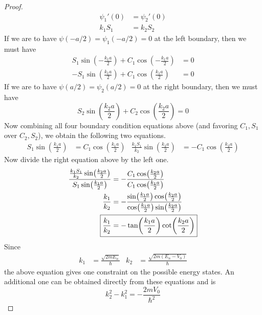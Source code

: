 \documentclass[../psets.tex]{subfiles}
\begin{document}
\begin{enumerate}
\begin{enumerate}
\begin{proof}
            \begin{align*}
                \psi_1'(0) &= \psi_2'(0)\\
                k_1S_1 &= k_2S_2
            \end{align*}
            If we are to have $\psi(-a/2)=\psi_1(-a/2)=0$ at the left boundary, then we must have
            \begin{align*}
                S_1\sin(-\frac{k_1a}{2})+C_1\cos(-\frac{k_1a}{2}) &= 0\\
                -S_1\sin(\frac{k_1a}{2})+C_1\cos(\frac{k_1a}{2}) &= 0
            \end{align*}
            If we are to have $\psi(a/2)=\psi_2(a/2)=0$ at the right boundary, then we must have
            \begin{equation*}
                S_2\sin(\frac{k_2a}{2})+C_2\cos(\frac{k_2a}{2}) = 0
            \end{equation*}
            Now combining all four boundary condition equations above (and favoring $C_1,S_1$ over $C_2,S_2$), we obtain the following two equations.
            \begin{align*}
                S_1\sin(\frac{k_1a}{2}) &= C_1\cos(\frac{k_1a}{2})&
                \frac{k_1S_1}{k_2}\sin(\frac{k_2a}{2}) &= -C_1\cos(\frac{k_2a}{2})
            \end{align*}
            Now divide the right equation above by the left one.
            \begin{align*}
                \frac{\frac{k_1S_1}{k_2}\sin(\frac{k_2a}{2})}{S_1\sin(\frac{k_1a}{2})} &= -\frac{C_1\cos(\frac{k_2a}{2})}{C_1\cos(\frac{k_1a}{2})}\\
                \frac{k_1}{k_2} &= -\frac{\sin(\frac{k_1a}{2})\cos(\frac{k_2a}{2})}{\cos(\frac{k_1a}{2})\sin(\frac{k_2a}{2})}\\
                \Aboxed{\frac{k_1}{k_2} &= -\tan(\frac{k_1a}{2})\cot(\frac{k_2a}{2})}
            \end{align*}
            Since
            \begin{align*}
                k_1 &= \frac{\sqrt{2mE_n}}{\hbar}&
                k_2 &= \frac{\sqrt{2m(E_n-V_0)}}{\hbar}
            \end{align*}
            the above equation gives one constraint on the possible energy states. An additional one can be obtained directly from these equations and is
            \begin{equation*}
                \boxed{k_2^2-k_1^2 = -\frac{2mV_0}{\hbar^2}}
            \end{equation*}

\end{proof}
\end{enumerate}
\end{enumerate}
\end{document}
